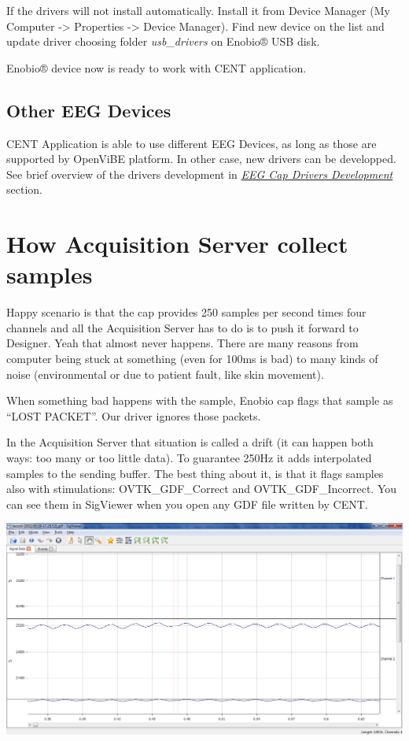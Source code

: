 \documentclass[letterpaper,10pt,english]{sphinxmanual}
\begin{document}
If the drivers will not install automatically. Install it from Device Manager (My Computer -\textgreater{} Properties -\textgreater{} Device Manager). Find new device on the list and update driver choosing folder \emph{usb\_drivers} on Enobio® USB disk.

Enobio® device now is ready to work with CENT application.


\subsection{\textbf{Other EEG Devices}}
\label{index:other-eeg-devices}
CENT Application is able to use different EEG Devices, as long as those are supported by OpenViBE platform. In other case, new drivers can be developped. See brief overview of the drivers development in {\hyperref[index:eeg-cap-drivers-development]{\emph{EEG Cap Drivers Development}}} section.


\section{\textbf{How Acquisition Server collect samples}}
\label{index:how-acquisition-server-collect-samples}
Happy scenario is that the cap provides 250 samples per second times four channels and all the Acquisition Server has to do is to push it forward to Designer. Yeah that almost never happens. There are many reasons from computer being stuck at something (even for 100ms is bad) to many kinds of noise (environmental or due to patient fault, like skin movement).

When something bad happens with the sample, Enobio cap flags that sample as ``LOST PACKET''. Our driver ignores those packets.

In the Acquisition Server that situation is called a drift (it can happen both ways: too many or too little data). To guarantee 250Hz it adds interpolated samples to the sending buffer. The best thing about it, is that it flags samples also with stimulations: OVTK\_GDF\_Correct and OVTK\_GDF\_Incorrect. You can see them in SigViewer when you open any GDF file written by CENT.

{\hfill\includegraphics{SigViewer.PNG}\hfill}
\end{document}
